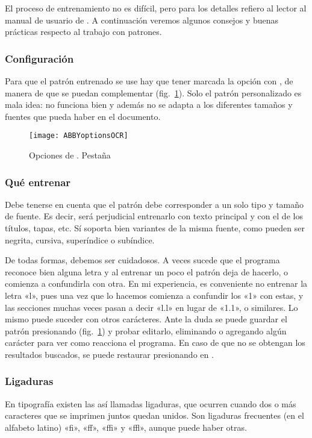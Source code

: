 \documentclass[%
	a5paper,
	10pt,
	twoside,
	openright,
	final,
]{memoir}
\begin{document}
	El proceso de entrenamiento no es difícil, pero para los detalles refiero al lector al manual de usuario de \abby. A continuación veremos algunos consejos y buenas prácticas respecto al trabajo con patrones.

	\subsubsection{Configuración} Para que el patrón entrenado se use hay que tener marcada la opción  con , de manera de que se puedan complementar (fig.~\ref{fig:ABBYoptionsOCR}). Solo el patrón personalizado es mala idea: no funciona bien y además no se adapta a los diferentes tamaños y fuentes que pueda haber en el documento.

	\begin{figure}
		\centering
		\texttt{[image: ABBYoptionsOCR]}
		\caption[Opciones de \abby. Pestaña OCR]{Opciones de \abby. Pestaña \label{fig:ABBYoptionsOCR}}
	\end{figure}

	\subsubsection{Qué entrenar} Debe tenerse en cuenta que el patrón debe corresponder a un solo tipo y tamaño de fuente. Es decir, será perjudicial entrenarlo con texto principal y con el de los títulos, tapas, etc. Sí soporta bien variantes de la misma fuente, como pueden ser negrita, cursiva, superíndice o subíndice.

	De todas formas, debemos ser cuidadosos. A veces sucede que el programa reconoce bien alguna letra y al entrenar un poco el patrón deja de hacerlo, o comienza a confundirla con otra. En mi experiencia, es conveniente no entrenar la letra «l», pues una vez que lo hacemos comienza a confundir los «1» con estas, y las secciones muchas veces pasan a decir «l.l» en lugar de «1.1», o similares. Lo mismo puede suceder con otros carácteres. Ante la duda se puede guardar el patrón presionando  (fig.~\ref{fig:ABBYoptionsOCR}) y probar editarlo, eliminando o agregando algún carácter para ver como reacciona el programa. En caso de que no se obtengan los resultados buscados, se puede restaurar presionando en .

	\subsubsection{Ligaduras} En tipografía existen las así llamadas ligaduras, que ocurren cuando dos o más caracteres que se imprimen juntos quedan unidos. Son ligaduras frecuentes (en el alfabeto latino) «fi», «ff», «ffi» y «ffl», aunque puede haber otras.
\end{document}
